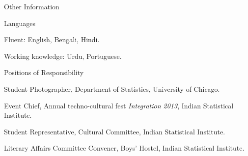 \documentclass{resume} %
\begin{document}
\begin{rSection}{Other Information}
\begin{rSubsection}{Languages}{}{}{} 
\item Fluent: English, Bengali, Hindi.
\item Working knowledge: Urdu, Portuguese.
\end{rSubsection}


\begin{rSubsection}{Positions of Responsibility}{}{}{} 
\item Student Photographer, Department of Statistics, University of Chicago.
\item Event Chief, Annual techno-cultural fest {\it Integration 2013}, Indian Statistical Institute.
\item Student Representative, Cultural Committee, Indian Statistical Institute.
\item Literary Affairs Committee Convener, Boys' Hostel, Indian Statistical Institute.
\end{rSubsection}



\end{rSection}
\end{document}
